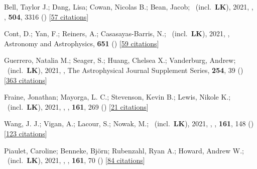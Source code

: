 \item[{\color{numcolor}\scriptsize55}] Bell, Taylor J.; Dang, Lisa; Cowan, Nicolas B.; Bean, Jacob; \etal\ (incl.\ \textbf{LK}), 2021, , \mnras, \textbf{504}, 3316 () [\href{https://ui.adsabs.harvard.edu/abs/2021MNRAS.504.3316B}{57 citations}]

\item[{\color{numcolor}\scriptsize54}] Cont, D.; Yan, F.; Reiners, A.; Casasayas-Barris, N.; \etal\ (incl.\ \textbf{LK}), 2021, , Astronomy and Astrophysics, \textbf{651} () [\href{https://ui.adsabs.harvard.edu/abs/2021A&A...651A..33C}{59 citations}]

\item[{\color{numcolor}\scriptsize53}] Guerrero, Natalia M.; Seager, S.; Huang, Chelsea X.; Vanderburg, Andrew; \etal\ (incl.\ \textbf{LK}), 2021, , The Astrophysical Journal Supplement Series, \textbf{254}, 39 () [\href{https://ui.adsabs.harvard.edu/abs/2021ApJS..254...39G}{363 citations}]

\item[{\color{numcolor}\scriptsize52}] Fraine, Jonathan; Mayorga, L. C.; Stevenson, Kevin B.; Lewis, Nikole K.; \etal\ (incl.\ \textbf{LK}), 2021, , \aj, \textbf{161}, 269 () [\href{https://ui.adsabs.harvard.edu/abs/2021AJ....161..269F}{21 citations}]

\item[{\color{numcolor}\scriptsize51}] Wang, J. J.; Vigan, A.; Lacour, S.; Nowak, M.; \etal\ (incl.\ \textbf{LK}), 2021, , \aj, \textbf{161}, 148 () [\href{https://ui.adsabs.harvard.edu/abs/2021AJ....161..148W}{123 citations}]

\item[{\color{numcolor}\scriptsize50}] Piaulet, Caroline; Benneke, Bj{\"o}rn; Rubenzahl, Ryan A.; Howard, Andrew W.; \etal\ (incl.\ \textbf{LK}), 2021, , \aj, \textbf{161}, 70 () [\href{https://ui.adsabs.harvard.edu/abs/2021AJ....161...70P}{84 citations}]

